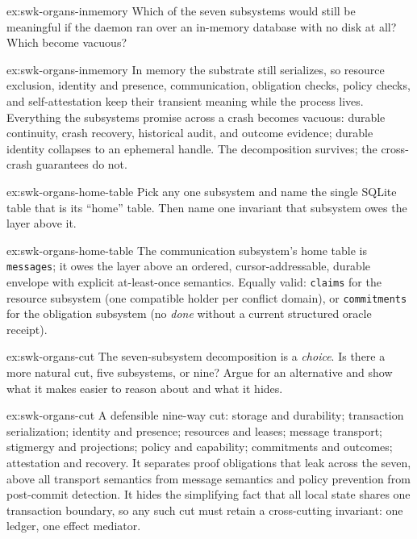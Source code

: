 \documentclass[11pt,a4paper]{article}
\theoremstyle{definition}
\theoremstyle{remark}
\begin{document}

\begin{pdexercise}[kind=Check,rating=1]{ex:swk-organs-inmemory}
Which of the seven subsystems would still be meaningful if the daemon ran over an in-memory database with no disk at all? Which become vacuous?
\end{pdexercise}
\begin{pdsolution}{ex:swk-organs-inmemory}
In memory the substrate still serializes, so resource exclusion, identity and presence, communication, obligation checks, policy checks, and self-attestation keep their transient meaning while the process lives. Everything the subsystems promise across a crash becomes vacuous: durable continuity, crash recovery, historical audit, and outcome evidence; durable identity collapses to an ephemeral handle. The decomposition survives; the cross-crash guarantees do not.
\end{pdsolution}
\begin{pdexercise}[kind=Trace,rating=2]{ex:swk-organs-home-table}
Pick any one subsystem and name the single SQLite table that is its ``home'' table. Then name one invariant that subsystem owes the layer above it.
\end{pdexercise}
\begin{pdsolution}{ex:swk-organs-home-table}
The communication subsystem's home table is \texttt{messages}; it owes the layer above an ordered, cursor-addressable, durable envelope with explicit at-least-once semantics. Equally valid: \texttt{claims} for the resource subsystem (one compatible holder per conflict domain), or \texttt{commitments} for the obligation subsystem (no \emph{done} without a current structured oracle receipt).
\end{pdsolution}
\begin{pdexercise}[kind=Open,rating=3]{ex:swk-organs-cut}
The seven-subsystem decomposition is a \emph{choice}. Is there a more natural cut, five subsystems, or nine? Argue for an alternative and show what it makes easier to reason about and what it hides.
\end{pdexercise}
\begin{pdsolution}{ex:swk-organs-cut}
A defensible nine-way cut: storage and durability; transaction serialization; identity and presence; resources and leases; message transport; stigmergy and projections; policy and capability; commitments and outcomes; attestation and recovery. It separates proof obligations that leak across the seven, above all transport semantics from message semantics and policy prevention from post-commit detection. It hides the simplifying fact that all local state shares one transaction boundary, so any such cut must retain a cross-cutting invariant: one ledger, one effect mediator.
\end{pdsolution}
\end{document}
